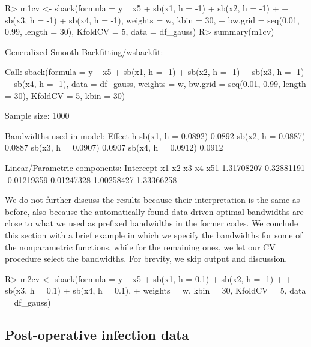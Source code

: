 \begin{Schunk}
\begin{Sinput}
R> m1cv <- sback(formula = y ~ x5 + sb(x1, h = -1) + sb(x2, h = -1) + 
+   sb(x3, h = -1) + sb(x4, h = -1), weights = w, kbin = 30,  
+   bw.grid = seq(0.01, 0.99, length = 30), KfoldCV = 5, data = df_gauss)
R> summary(m1cv)
\end{Sinput}

\begin{Soutput}
Generalized Smooth Backfitting/wsbackfit:

Call: sback(formula = y ~ x5 + sb(x1, h = -1) + sb(x2, h = -1) + sb(x3, 
    h = -1) + sb(x4, h = -1), data = df_gauss, weights = w, bw.grid = seq(0.01, 
    0.99, length = 30), KfoldCV = 5, kbin = 30)

Sample size: 1000 

Bandwidths used in model:
 Effect             h     
 sb(x1, h = 0.0892) 0.0892
 sb(x2, h = 0.0887) 0.0887
 sb(x3, h = 0.0907) 0.0907
 sb(x4, h = 0.0912) 0.0912

Linear/Parametric components:
  Intercept          x1          x2          x3          x4         x51 
 1.31708207  0.32881191 -0.01219359  0.01247328  1.00258427  1.33366258 
\end{Soutput}
\end{Schunk}

We do not further discuss the results because their interpretation is the same as before, also because the automatically found data-driven optimal bandwidths are close to what we used as prefixed bandwidths in the former codes. We conclude this section with a brief example in which we specify the bandwidths for some of the nonparametric functions, while for the remaining ones, we let our CV procedure select the bandwidths. For brevity, we skip output and discussion.

\begin{Schunk}
\begin{Sinput}
R> m2cv <- sback(formula = y ~ x5 + sb(x1, h = 0.1) + sb(x2, h = -1) + 
+ 	sb(x3, h = 0.1) + sb(x4, h = 0.1), 
+	weights = w, kbin = 30, KfoldCV = 5, data = df_gauss)
\end{Sinput}
\end{Schunk}



\subsection{Post-operative infection data}

